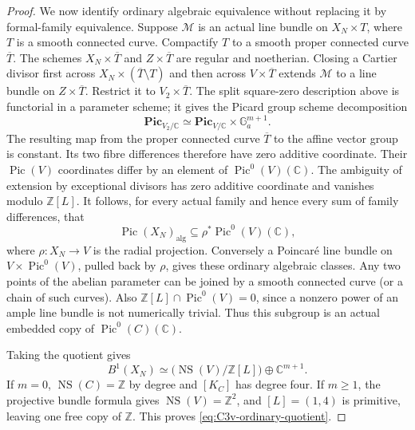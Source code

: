 \begin{proof}
We now identify ordinary algebraic equivalence without
replacing it by formal-family equivalence. Suppose
$\mathcal M$ is an actual line bundle on $X_N\times T$,
where $T$ is a smooth connected curve. Compactify $T$
to a smooth proper connected curve $\overline T$.
The schemes $X_N\times\overline T$ and
$Z\times\overline T$ are regular and noetherian.
Closing a Cartier divisor first across
$X_N\times(\overline T\setminus T)$ and then across
$V\times\overline T$ extends $\mathcal M$ to a line
bundle on $Z\times\overline T$. Restrict it to
$V_2\times\overline T$. The split square-zero
description above is functorial in a parameter scheme;
it gives the Picard group scheme decomposition
\[
 \mathbf{Pic}_{V_2/\mathbb C}
   \simeq \mathbf{Pic}_{V/\mathbb C}
                       \times\mathbb G_a^{m+1}.
\]
The resulting map from the proper connected curve
$\overline T$ to the affine vector group is constant.
Its two fibre differences therefore have zero additive
coordinate. Their $\operatorname{Pic}(V)$ coordinates
differ by an element of $\operatorname{Pic}^0(V)(\mathbb C)$.
The ambiguity of extension by exceptional divisors has
zero additive coordinate and vanishes modulo $\mathbb Z[L]$.
It follows, for every actual family and hence every sum
of family differences, that
\[
 \operatorname{Pic}(X_N)_{\mathrm{alg}}
       \subseteq\rho^*\operatorname{Pic}^0(V)(\mathbb C),
\]
where $\rho:X_N\to V$ is the radial projection.
Conversely a Poincar\'e line bundle on
$V\times\operatorname{Pic}^0(V)$, pulled back by $\rho$,
gives these ordinary algebraic classes. Any two points
of the abelian parameter can be joined by a smooth
connected curve (or a chain of such curves). Also
$\mathbb Z[L]\cap\operatorname{Pic}^0(V)=0$, since a
nonzero power of an ample line bundle is not numerically
trivial. Thus this subgroup is an actual embedded copy
of $\operatorname{Pic}^0(C)(\mathbb C)$.

Taking the quotient gives
\[
 B^1(X_N)\simeq
       \bigl(\operatorname{NS}(V)/\mathbb Z[L]\bigr)
                                      \oplus\mathbb C^{m+1}.
\]
If $m=0$, $\operatorname{NS}(C)=\mathbb Z$ by degree and
$[K_C]$ has degree four. If $m\ge1$, the projective
bundle formula gives $\operatorname{NS}(V)=\mathbb Z^2$,
and $[L]=(1,4)$ is primitive, leaving one free copy
of $\mathbb Z$. This proves \eqref{eq:C3v-ordinary-quotient}.


\end{proof}
